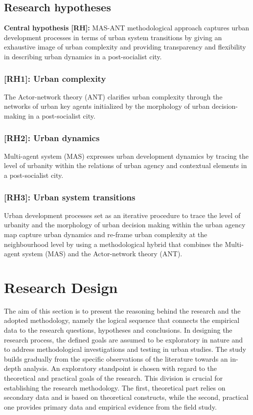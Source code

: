 \documentclass[11pt]{report}
\begin{document}
{{{{\subsection{Research hypotheses}
\textbf{Central hypothesis [RH]:}
MAS-ANT methodological approach captures urban development processes in terms of urban system transitions by giving an exhaustive image of urban complexity and providing transparency and flexibility in describing urban dynamics in a post-socialist city.

\subsubsection{[RH1]: Urban complexity}

The Actor-network theory (ANT) clarifies urban complexity through the networks of urban key agents initialized by the morphology of urban decision-making in a post-socialist city.

\subsubsection{[RH2]: Urban dynamics}

Multi-agent system (MAS) expresses urban development dynamics by tracing the level of urbanity within the relations of urban agency and contextual elements in a post-socialist city.

\subsubsection{[RH3]: Urban system transitions}

Urban development processes set as an iterative procedure to trace the level of urbanity and the morphology of urban decision making within the urban agency map capture urban dynamics and re-frame urban complexity at the neighbourhood level by using a methodological hybrid that combines the Multi-agent system (MAS) and the Actor-network theory (ANT).

\section{Research Design}

The aim of this section is to present the reasoning behind the research and the adopted methodology, namely the logical sequence that connects the empirical data to the research questions, hypotheses and conclusions. In designing the research process, the defined goals are assumed to be exploratory in nature and to address methodological investigations and testing in urban studies. The study builds gradually from the specific observations of the literature towards an in-depth analysis. An exploratory standpoint is chosen with regard to the theoretical and practical goals of the research. This division is crucial for establishing the research methodology. The first, theoretical part relies on secondary data and is based on theoretical constructs, while the second, practical one provides primary data and empirical evidence from the field study.
\\

}}}}
\end{document}
